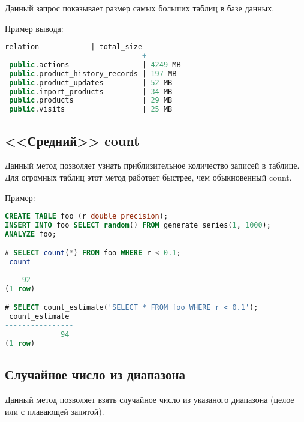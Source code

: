 Данный запрос показывает размер самых больших таблиц в базе данных.



Пример вывода:
\begin{lstlisting}[language=SQL,label=lst:snippets4,caption=Размер самых больших таблиц. Пример вывода]
            relation            | total_size
--------------------------------+------------
 public.actions                 | 4249 MB
 public.product_history_records | 197 MB
 public.product_updates         | 52 MB
 public.import_products         | 34 MB
 public.products                | 29 MB
 public.visits                  | 25 MB
\end{lstlisting}


\subsection{<<Средний>> count}

Данный метод позволяет узнать приблизительное количество записей в таблице. Для огромных таблиц этот метод работает быстрее, чем обыкновенный count.



Пример:

\begin{lstlisting}[language=SQL,label=lst:snippets51,caption=<<Средний>> count. Пример]
CREATE TABLE foo (r double precision);
INSERT INTO foo SELECT random() FROM generate_series(1, 1000);
ANALYZE foo;

# SELECT count(*) FROM foo WHERE r < 0.1;
 count
-------
    92
(1 row)

# SELECT count_estimate('SELECT * FROM foo WHERE r < 0.1');
 count_estimate
----------------
             94
(1 row)
\end{lstlisting}



\subsection{Случайное число из диапазона}

Данный метод позволяет взять случайное число из указаного диапазона (целое или с плавающей запятой).



